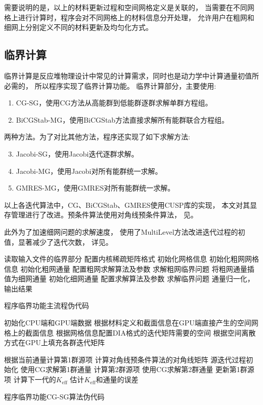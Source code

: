 需要说明的是，以上的材料更新过程和空间网格定义是关联的，
当需要在不同网格上进行计算时，程序会对不同网格上的材料信息分开处理，
允许用户在粗网和细网上分别定义不同的材料更新及均匀化方式。


\subsection{临界计算}
\label{sec:program.eigen}

临界计算是反应堆物理设计中常见的计算需求，同时也是动力学中计算通量初值所必需的，
所以\ProgramName 程序实现了临界计算功能。
临界计算部分，\ProgramName 主要使用:
\begin{enumerate}
\item CG-SG，使用CG方法从高能群到低能群逐群求解单群方程组。
\item BiCGStab-MG，使用BiCGStab方法直接求解所有能群联合方程组。
\end{enumerate}
两种方法。为了对比其他方法，程序还实现了如下求解方法:
\begin{enumerate}
\setcounter{enumi}{2}
\item Jacobi-SG，使用Jacobi迭代逐群求解。
\item Jacobi-MG，使用Jacobi对所有能群统一求解。
\item GMRES-MG，使用GMRES对所有能群统一求解。
\end{enumerate}
以上各迭代算法中，CG、BiCGStab、GMRES使用CUSP库的实现，
本文对其显存管理进行了改进。预条件算法使用对角线预条件算法，
见。

此外\ProgramName 为了加速细网问题的求解速度，
使用了MultiLevel方法改进迭代过程的初值，显著减少了迭代次数，
详见。


\begin{algorithm}
读取输入文件的临界部分 \algoend
配置内核稀疏矩阵格式\;
初始化网格信息\;
{
  初始化粗网网格信息 \algoend
  初始化粗网通量\;
  配置粗网求解算法及参数 \algoend
  求解粗网临界问题\;
  将粗网通量插值为细网通量\;
}
\Else
{
  初始化细网通量\;
}
配置求解算法及参数 \algoend
求解临界问题\;
通量归一化，输出结果\;
\caption{\label{alg:program.eigen.main}\ProgramName 程序临界功能主流程伪代码}
\end{algorithm}


\begin{algorithm}
初始化CPU端和GPU端数据\;
根据材料定义和截面信息在GPU端直接产生的空间网格上的截面信息\;
根据网格信息配置DIA格式的迭代矩阵需要的空间\;
根据空间离散方式在GPU上填充各群迭代矩阵\;

根据当前通量计算第1群源项\;
计算对角线预条件算法的对角线矩阵\;
源迭代过程初始化\;
{
  使用CG求解第1群通量 \algoend
  计算第2群源项\;
  使用CG求解第2群通量 \algoend
  更新第1群源项\;
  计算下一代的$K_\mathrm{eff}$ \algoend
  估计$K_\mathrm{eff}$和通量的误差\;
}
\caption{\label{alg:program.eigen.cg-sg}\ProgramName 程序临界功能CG-SG算法伪代码}
\end{algorithm}


